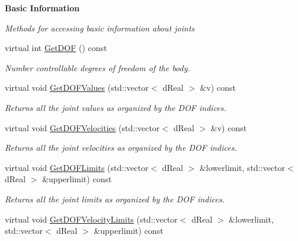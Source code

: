 \begin{Indent}{\bf Basic Information}\par
{\em \label{_amgrp87cabb0c5e5abac7a37df3f21bf09d17}
 Methods for accessing basic information about joints }\begin{DoxyCompactItemize}
\item 
virtual int \hyperlink{classOpenRAVE_1_1KinBody_a44fbec2fd26a45cada889c5c0f0751c8}{GetDOF} () const 
\begin{DoxyCompactList}\small\item\em Number controllable degrees of freedom of the body. \item\end{DoxyCompactList}\item 
\hypertarget{classOpenRAVE_1_1KinBody_aa07f040a19a9fe7b80254915b1cce26b}{
virtual void \hyperlink{classOpenRAVE_1_1KinBody_aa07f040a19a9fe7b80254915b1cce26b}{GetDOFValues} (std::vector$<$ dReal $>$ \&v) const }
\label{classOpenRAVE_1_1KinBody_aa07f040a19a9fe7b80254915b1cce26b}

\begin{DoxyCompactList}\small\item\em Returns all the joint values as organized by the DOF indices. \item\end{DoxyCompactList}\item 
\hypertarget{classOpenRAVE_1_1KinBody_af77a7f1b7f83bbd441c8e488c2f57e94}{
virtual void \hyperlink{classOpenRAVE_1_1KinBody_af77a7f1b7f83bbd441c8e488c2f57e94}{GetDOFVelocities} (std::vector$<$ dReal $>$ \&v) const }
\label{classOpenRAVE_1_1KinBody_af77a7f1b7f83bbd441c8e488c2f57e94}

\begin{DoxyCompactList}\small\item\em Returns all the joint velocities as organized by the DOF indices. \item\end{DoxyCompactList}\item 
\hypertarget{classOpenRAVE_1_1KinBody_a3eb84ab4c44c1589ca8ff5ffaf14ddc3}{
virtual void \hyperlink{classOpenRAVE_1_1KinBody_a3eb84ab4c44c1589ca8ff5ffaf14ddc3}{GetDOFLimits} (std::vector$<$ dReal $>$ \&lowerlimit, std::vector$<$ dReal $>$ \&upperlimit) const }
\label{classOpenRAVE_1_1KinBody_a3eb84ab4c44c1589ca8ff5ffaf14ddc3}

\begin{DoxyCompactList}\small\item\em Returns all the joint limits as organized by the DOF indices. \item\end{DoxyCompactList}\item 
\hypertarget{classOpenRAVE_1_1KinBody_a62447722990a87e074023da86ce5bb74}{
virtual void \hyperlink{classOpenRAVE_1_1KinBody_a62447722990a87e074023da86ce5bb74}{GetDOFVelocityLimits} (std::vector$<$ dReal $>$ \&lowerlimit, std::vector$<$ dReal $>$ \&upperlimit) const }
\label{classOpenRAVE_1_1KinBody_a62447722990a87e074023da86ce5bb74}


\end{DoxyCompactItemize}
\end{Indent}
